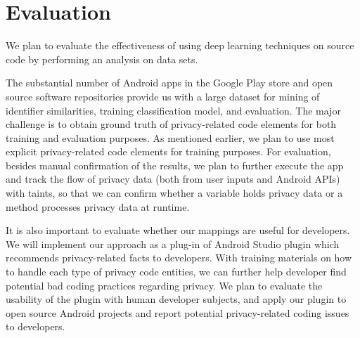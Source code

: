 \section{Evaluation}

We plan to evaluate the effectiveness of using deep learning techniques on source code by performing an analysis on data sets.

The substantial number of Android apps in the Google Play store and open source software repositories provide us with a large dataset for mining of identifier similarities, training classification model, and evaluation. The major challenge is to obtain ground truth of privacy-related code elements for both training and evaluation purposes. As mentioned earlier, we plan to use most explicit privacy-related code elements for training purposes. For evaluation, besides manual confirmation of the results, we plan to further execute the app and track the flow of privacy data (both from user inputs and Android APIs) with taints, so that we can confirm whether a variable holds privacy data or a method processes privacy data at runtime.

It is also important to evaluate whether our mappings are useful for developers. We will implement our approach as a plug-in of Android Studio plugin which recommends privacy-related facts to developers. With training materials on how to handle each type of privacy code entities, we can further help developer find potential bad coding practices regarding privacy. We plan to evaluate the usability of the plugin with human developer subjects, and apply our plugin to open source Android projects and report potential privacy-related coding issues to developers.
	